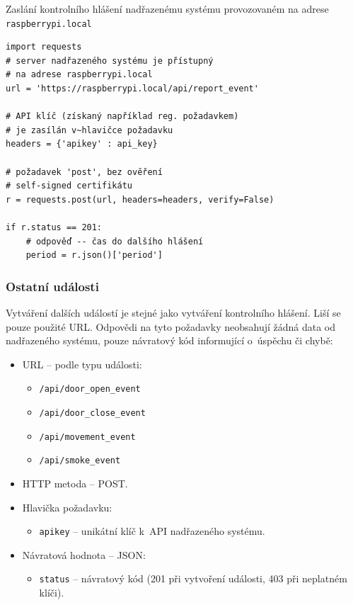 \begin{listing}[htbp]
\caption{\label{lst:api_report} Zaslání kontrolního hlášení nadřazenému systému provozovaném na adrese \texttt{raspberrypi.local}}
\begin{verbatim}
import requests
# server nadřazeného systému je přístupný
# na adrese raspberrypi.local
url = 'https://raspberrypi.local/api/report_event'

# API klíč (získaný například reg. požadavkem)
# je zasílán v~hlavičce požadavku
headers = {'apikey' : api_key}

# požadavek 'post', bez ověření
# self-signed certifikátu
r = requests.post(url, headers=headers, verify=False)

if r.status == 201:
    # odpověď -- čas do dalšího hlášení
    period = r.json()['period']

\end{verbatim}
\end{listing}

\subsubsection{Ostatní události}

Vytváření dalších událostí je stejné jako vytváření kontrolního hlášení. Liší se pouze použité URL. Odpovědi na tyto požadavky neobsahují žádná data od nadřazeného systému, pouze návratový kód informující o~úspěchu či chybě:

\begin{itemize}
    \item URL -- podle typu události:
    \begin{itemize}
        \item \texttt{/api/door\_open\_event}
        \item \texttt{/api/door\_close\_event}
        \item \texttt{/api/movement\_event}
        \item \texttt{/api/smoke\_event}
    \end{itemize}
    \item HTTP metoda -- POST.
    \item Hlavička požadavku:
    \begin{itemize}
        \item \texttt{apikey} -- unikátní klíč k~API nadřazeného systému.
    \end{itemize}
    \item Návratová hodnota -- JSON:
    \begin{itemize}
        \item \texttt{status} -- návratový kód (201 při vytvoření události, 403 při neplatném klíči).
    \end{itemize}
\end{itemize}

